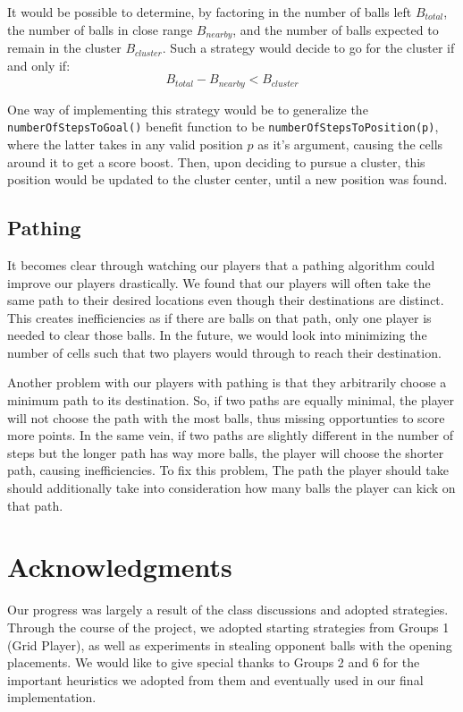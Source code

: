 \documentclass[
10pt, %
letterpaper, %
oneside, %
headinclude,footinclude, %
english
]{article}
\begin{document}
It would be possible to determine, by factoring in the number of balls left $B_{total}$, the number of balls in close range $B_{nearby}$, and the number of balls expected to remain in the cluster $B_{cluster}$. Such a strategy would decide to go for the cluster if and only if: 
$$B_{total} - B_{nearby} < B_{cluster}$$

One way of implementing this strategy would be to generalize the  \texttt{numberOfStepsToGoal()} benefit function to be \texttt{numberOfStepsToPosition(p)}, where the latter takes in any valid position $p$ as it’s argument, causing the cells around it to get a score boost. Then, upon deciding to pursue a cluster, this position would be updated to the cluster center, until a new position was found.

\subsection{Pathing}
It becomes clear through watching our players that a pathing algorithm could improve our players drastically. We found that our players will often take the same path to their desired locations even though their destinations are distinct. This creates inefficiencies as if there are balls on that path, only one player is needed to clear those balls. In the future, we would look into minimizing the number of cells such that two players would through to reach their destination. 

Another problem with our players with pathing is that they arbitrarily choose a minimum path to its destination. So, if two paths are equally minimal, the player will not choose the path with the most balls, thus missing opportunties to score more points. In the same vein, if two paths are slightly different in the number of steps but the longer path has way more balls, the player will choose the shorter path, causing inefficiencies. To fix this problem, The path the player should take should additionally take into consideration how many balls the player can kick on that path.

\section{Acknowledgments}

Our progress was largely a result of the class discussions and adopted strategies. Through the course of the project, we adopted starting strategies from Groups 1 (Grid Player), as well as experiments in stealing opponent balls with the opening placements. We would like to give special thanks to Groups 2 and 6 for the important heuristics we adopted from them and eventually used in our final implementation. 
\end{document}

